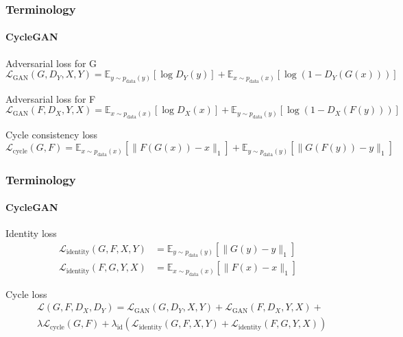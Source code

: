 \documentclass[aspectratio=169, lecture, amberg]{OTHAWbeamer}
\begin{document}
\begin{frame}
\frametitle{Terminology}
\framesubtitle{CycleGAN}
\begin{block}{Adversarial loss for G}
\begin{equation}
\mathcal{L}_{\text{GAN}}(G, D_Y, X, Y) = \mathbb{E}_{y \sim p_{\text{data}}(y)} [\log D_Y(y)] + \mathbb{E}_{x \sim p_{\text{data}}(x)} [\log(1 - D_Y(G(x)))]
\end{equation}
\end{block}

\begin{block}{Adversarial loss for F}
\begin{equation}
\mathcal{L}_{\text{GAN}}(F, D_X, Y, X) = \mathbb{E}_{x \sim p_{\text{data}}(x)} [\log D_X(x)] + \mathbb{E}_{y \sim p_{\text{data}}(y)} [\log(1 - D_X(F(y)))]
\end{equation}
\end{block}

\begin{block}{Cycle consistency loss}
\begin{equation}
\mathcal{L}_{\text{cycle}}(G, F) = \mathbb{E}_{x \sim p_{\text{data}}(x)} [\lVert F(G(x)) - x \rVert_1] + \mathbb{E}_{y \sim p_{\text{data}}(y)} [\lVert G(F(y)) - y \rVert_1]
\end{equation}
\end{block}
\end{frame}

\begin{frame}
\frametitle{Terminology}
\framesubtitle{CycleGAN}
\begin{block}{Identity loss}
\begin{align}
\mathcal{L}_{\text{identity}}(G, F, X, Y) & = \mathbb{E}_{y \sim p_{\text{data}}(y)} [\lVert G(y) - y \rVert_1] \\
\mathcal{L}_{\text{identity}}(F, G, Y, X) & = \mathbb{E}_{x \sim p_{\text{data}}(x)} [\lVert F(x) - x \rVert_1]
\end{align}
\end{block}

\begin{block}{Cycle loss}
\begin{equation}
    \begin{split}
        &\mathcal{L}(G, F, D_X, D_Y) = \mathcal{L}_{\text{GAN}}(G, D_Y, X, Y) + \mathcal{L}_{\text{GAN}}(F, D_X, Y, X) + \\
        &\lambda \mathcal{L}_{\text{cycle}}(G, F) + \lambda_{\text{id}} \left( \mathcal{L}_{\text{identity}}(G, F, X, Y) + \mathcal{L}_{\text{identity}}(F, G, Y, X) \right)
    \end{split}    
    \end{equation}
\end{block}
\end{frame}
\end{document}
